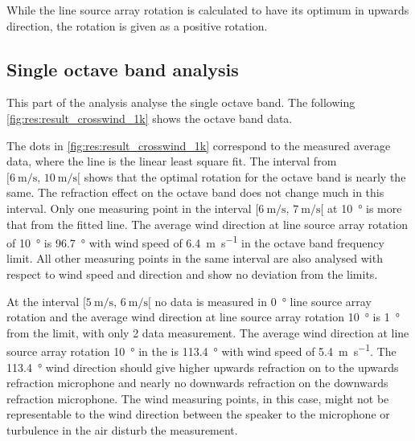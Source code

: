 While the line source array rotation is calculated to have its optimum in upwards direction, the rotation is given as a positive rotation. 


\subsection{Single octave band analysis}\label{res:ana:single}
This part of the analysis analyse the single octave band. The following \autoref{fig:res:result_crosswind_1k}  shows the  octave band data.  

 

 
 The dots in \autoref{fig:res:result_crosswind_1k} correspond to the measured average data, where the line is the linear least square fit. The interval from $[\SI{6}{\meter\per\second},\, \SI{10}{\meter\per\second}[ $ shows that the optimal rotation for the  octave band is nearly the same. The refraction effect on the   octave band does not change much in this interval. Only one measuring point in the interval $[\SI{6}{\meter\per\second},\, \SI{7}{\meter\per\second}[ $ at \SI{10}{\degree} is more that  from the fitted line. The average wind direction at line source array rotation of \SI{10}{\degree} is \SI{96.7}{\degree} with wind speed of \SI{6.4}{\meter\per\second} in the  octave band frequency limit. All other measuring points in the same interval are also analysed with respect to wind speed and direction and show no deviation from the limits. 

At the interval $[\SI{5}{\meter\per\second},\, \SI{6}{\meter\per\second}[ $ no data is measured in \SI{0}{\degree} line source array rotation and the average wind direction at line source array rotation \SI{10}{\degree} is \SI{1}{\degree} from the limit, with only 2 data measurement. The average wind direction at line source array rotation \SI{10}{\degree} in the  is \SI{113.4}{\degree} with wind speed of \SI{5.4}{\meter\per\second}. The \SI{113.4}{\degree} wind direction should give higher upwards refraction on to the upwards refraction microphone and nearly no downwards refraction on the downwards refraction microphone. The wind measuring points, in this case, might not be representable to the wind direction between the speaker to the microphone or turbulence in the air disturb the measurement. 


